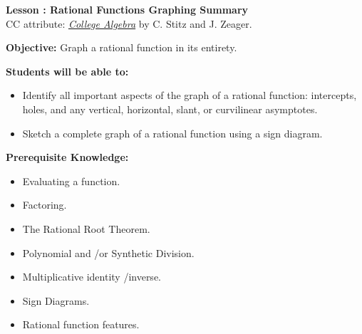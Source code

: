 \documentclass[12pt]{article}
\theoremstyle{definition}
\begin{document}
{\bf \large Lesson : Rational Functions Graphing Summary}\label{les:rationals_graphing_summary}
\\ CC attribute: \href{http://www.stitz-zeager.com}{\it{College Algebra}} by C. Stitz and J. Zeager. 
\hfill \doclicenseImage[imagewidth=5em]\\
\par
{\bf Objective:} Graph a rational function in its entirety.\\
\par
{\bf Students will be able to:}
\begin{itemize}
	\item Identify all important aspects of the graph of a rational function: intercepts, holes, and any vertical, horizontal, slant, or curvilinear asymptotes.
	\item Sketch a complete graph of a rational function using a sign diagram.
\end{itemize}
{\bf Prerequisite Knowledge:}
\begin{itemize}
	\item Evaluating a function.
	\item Factoring.
	\item The Rational Root Theorem.
	\item Polynomial and \slash or Synthetic Division.
	\item Multiplicative identity \slash inverse.
	\item Sign Diagrams.
	\item Rational function features.
\end{itemize}
\hrulefill
\end{document}
